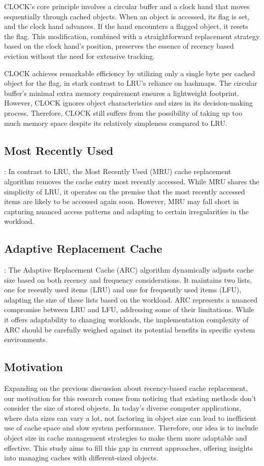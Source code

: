 \documentclass[conference]{IEEEtran}
\begin{document}
CLOCK's core principle involves a circular buffer and a clock hand that moves sequentially through cached objects. When an object is accessed, its flag is set, and the clock hand advances. If the hand encounters a flagged object, it resets the flag. This modification, combined with a straightforward replacement strategy based on the clock hand's position, preserves the essence of recency based eviction without the need for extensive tracking.

CLOCK achieves remarkable efficiency by utilizing only a single byte per cached object for the flag, in stark contrast to LRU's reliance on hashmaps. The circular buffer's minimal extra memory requirement ensures a lightweight footprint. However, CLOCK ignores object characteristics and sizes in its decision-making process. Therefore, CLOCK still suffers from the possibility of taking up too much memory space despite its relatively simpleness compared to LRU.

\subsection{Most Recently Used}: In contrast to LRU, the Most Recently Used (MRU) cache replacement algorithm removes the cache entry most recently accessed. While MRU shares the simplicity of LRU, it operates on the premise that the most recently accessed items are likely to be accessed again soon. However, MRU may fall short in capturing nuanced access patterns and adapting to certain irregularities in the workload.

\subsection{Adaptive Replacement Cache}: The Adaptive Replacement Cache (ARC) algorithm dynamically adjusts cache size based on both recency and frequency considerations. It maintains two lists, one for recently used items (LRU) and one for frequently used items (LFU), adapting the size of these lists based on the workload. ARC represents a nuanced compromise between LRU and LFU, addressing some of their limitations. While it offers adaptability to changing workloads, the implementation complexity of ARC should be carefully weighed against its potential benefits in specific system environments.

\subsection{Motivation}
Expanding on the previous discussion about recency-based cache replacement, our motivation for this research comes from noticing that existing methods don't consider the size of stored objects. In today's diverse computer applications, where data sizes can vary a lot, not factoring in object size can lead to inefficient use of cache space and slow system performance. Therefore, our idea is to include object size in cache management strategies to make them more adaptable and effective. This study aims to fill this gap in current approaches, offering insights into managing caches with different-sized objects.
\end{document}
